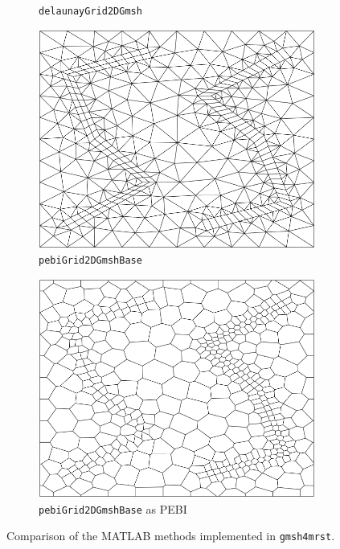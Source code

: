 \begin{figure}[p]
\begin{subfigure}[b]{0.49\textwidth}
        \caption{\texttt{delaunayGrid2DGmsh}}
        \label{fig:delaunayGrid2DGmsh}
    \end{subfigure}
    \begin{subfigure}[b]{0.49\textwidth}
        \centering
        \includegraphics[width=\textwidth]{report/Images/Combining software/Demo gmsh4mrst MATLAB/demo_pebiGrid2DGmshBase.png}
        \caption{\texttt{pebiGrid2DGmshBase}}
        \label{fig:pebiGrid2DGmshBase}
    \end{subfigure}
    \begin{subfigure}[b]{0.49\textwidth}
        \centering
        \includegraphics[width=\textwidth]{report/Images/Combining software/Demo gmsh4mrst MATLAB/demo_pebiGrid2DGmshBase_PEBI.png}
        \caption{\texttt{pebiGrid2DGmshBase} as PEBI}
        \label{fig:pebiGrid2DGmshBase_PEBI}
    \end{subfigure}
    \caption{Comparison of the MATLAB methods implemented in \texttt{gmsh4mrst}.}
    \label{fig:gmsh4mrst-MATLABmethods}
\end{figure}

